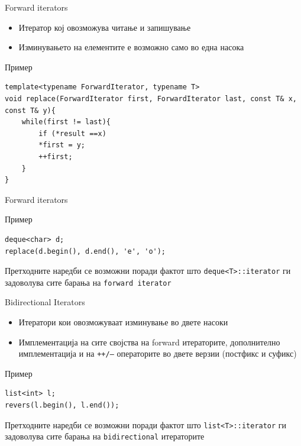 \begin{frame}[fragile]{Forward iterators}
\begin{itemize}
  \item Итератор кој овозможува читање и запишување
  \item Изминувањето на елементите е возможно само во една насока
\end{itemize}
\begin{block}{Пример}
\begin{lstlisting}
template<typename ForwardIterator, typename T>
void replace(ForwardIterator first, ForwardIterator last, const T& x, const T& y){
    while(first != last){
        if (*result ==x)
        *first = y;
        ++first;
    }
} 
\end{lstlisting}
\end{block}
\end{frame}

\begin{frame}[fragile]{Forward iterators}
\begin{block}{Пример}
\begin{lstlisting}
deque<char> d;
replace(d.begin(), d.end(), 'e', 'o');
\end{lstlisting}
\end{block}
Претходните наредби се возможни поради фактот што \texttt{deque<T>::iterator} ги
задоволува сите барања на \texttt{forward iterator}
\end{frame}


\begin{frame}[fragile]{Bidirectional Iterators}
\begin{itemize}
  \item Итератори кои овозможуваат изминување во двете насоки
  \item Имплементација на сите својства на forward итераторите, дополнително
  имплементација и на \texttt{++/--} операторите во двете верзии (постфикс и суфикс)
\end{itemize}
\begin{block}{Пример}
\begin{lstlisting}
list<int> l;
revers(l.begin(), l.end());
\end{lstlisting}
\end{block}
Претходните наредби се возможни поради фактот што \texttt{list<T>::iterator} ги
задоволува сите барања на \texttt{bidirectional} итераторите
\end{frame}


